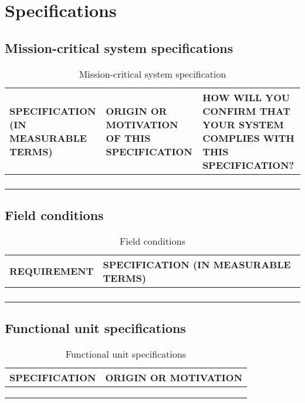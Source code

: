 
\section{Specifications}

\subsection{Mission-critical system specifications}

\begin{center}
\begin{longtable}{|p{5cm}|p{5cm}|p{5cm}|}
\hline
  \textbf{SPECIFICATION (IN MEASURABLE TERMS)} &
  \textbf{ORIGIN OR MOTIVATION OF THIS SPECIFICATION} &
  \textbf{HOW WILL YOU CONFIRM THAT YOUR SYSTEM COMPLIES WITH
           THIS SPECIFICATION?}\\
\hline
   &
   &
   \\
\hline
   &
   &
   \\
\hline
   &
   &
   \\
\hline
\caption{Mission-critical system specification}
\end{longtable}
\end{center}

\subsection{Field conditions}

\begin{center}
\begin{longtable}{|p{7.5cm}|p{7.5cm}|}
\hline
  \textbf{REQUIREMENT} &
  \textbf{SPECIFICATION (IN MEASURABLE TERMS)} \\
\hline
   &
   \\
\hline
   &
   \\
\hline
   &
   \\
\hline
\caption{Field conditions}
\end{longtable}
\end{center}

\subsection{Functional unit specifications}

\begin{center}
\begin{longtable}{|p{7.5cm}|p{7.5cm}|}
\hline
  \textbf{SPECIFICATION} & \textbf{ORIGIN OR MOTIVATION} \\
\hline
   &
   \\
\hline
   &
   \\
\hline
\caption{Functional unit specifications}
\end{longtable}
\end{center}

\newpage



